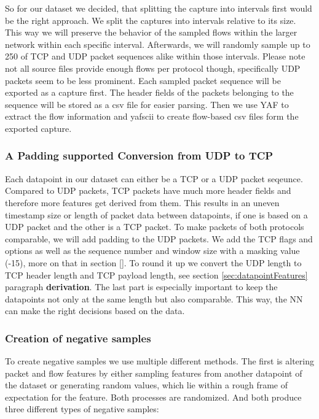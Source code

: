 \documentclass[
	ngerman,
	ruledheaders=section,%
	class=report,%
	thesis={type=bachelor},%
	accentcolor=9c,%
	custommargins=true,%
	marginpar=false,%
	parskip=half-,%
	fontsize=11pt,%
]{tudapub}
\begin{document}
So for our dataset we decided, that splitting the capture into intervals first would be the right approach.
We split the captures into intervals relative to its size.
This way we will preserve the behavior of the sampled flows within the larger network within each specific interval.
Afterwards, we will randomly sample up to 250 of TCP and UDP packet sequences alike within those intervals.
Please note not all source files provide enough flows per protocol though, specifically UDP packets seem to be less prominent.
Each sampled packet sequence will be exported as a capture first.
The header fields of the packets belonging to the sequence will be stored as a csv file for easier parsing.
Then we use YAF to extract the flow information and yafscii to create flow-based csv files form the exported capture.

\subsubsection{A Padding supported Conversion from UDP to TCP}
\label{sec:UDPpadding}

Each datapoint in our dataset can either be a TCP or a UDP packet seqeunce.
Compared to UDP packets, TCP packets have much more header fields and therefore more features get derived from them.
This results in an uneven timestamp size or length of packet data between datapoints, if one is based on a UDP packet and the other is a TCP packet.
To make packets of both protocols comparable, we will add padding to the UDP packets.
We add the TCP flags and options as well as the sequence number and window size with a masking value (-15), more on that in section \ref{}.
To round it up we convert the UDP length to TCP header length and TCP payload length, see section \ref{sec:datapointFeatures} paragraph \textbf{derivation}.
The last part is especially important to keep the datapoints not only at the same length but also comparable.
This way, the NN can make the right decisions based on the data.

\subsubsection{Creation of negative samples}
\label{sec:negativeSamples}

To create negative samples we use multiple different methods.
The first is altering packet and flow features by either sampling features from another datapoint of the dataset or generating random values, which lie within a rough frame of expectation for the feature.
Both processes are randomized.
And both produce three different types of negative samples:
\end{document}
